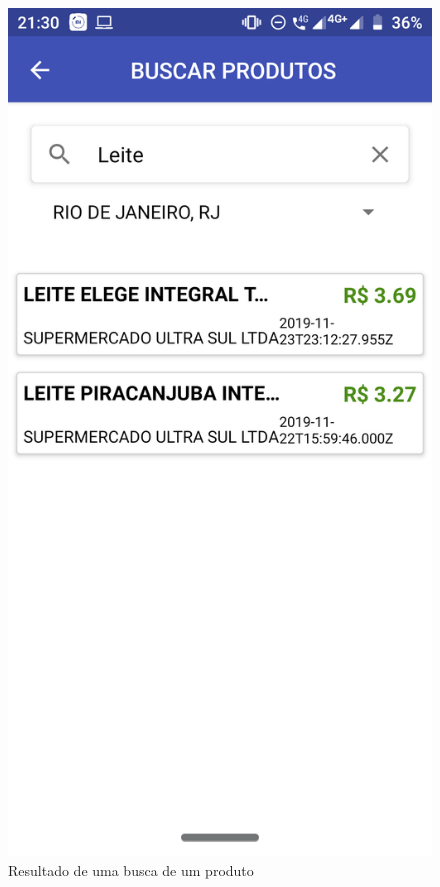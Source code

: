 \begin{figure}[h]
    \centering
    \includegraphics[scale=0.15]{tcc/figures/app/app_buscar_produtos_busca.png}
    \caption{Resultado de uma busca de um produto}
    \label{appBuscaProdutosBuscaResultadoFig}
\end{figure}

